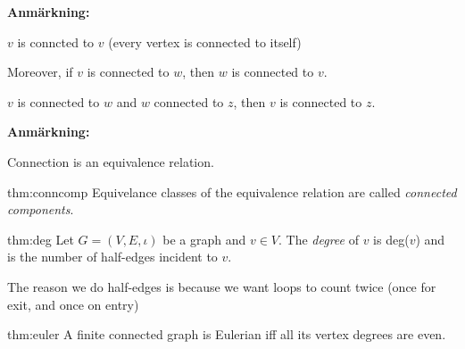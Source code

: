 \par\bigskip
\noindent\textbf{Anmärkning:}\par
\noindent $v$ is conncted to $v$ (every vertex is connected to itself)\par
\noindent Moreover, if $v$ is connected to $w$, then $w$ is connected to $v$.\par
\noindent $v$ is connected to $w$ and $w$ connected to $z$, then $v$ is connected to $z$.
\par\bigskip
\noindent\textbf{Anmärkning:}\par
\noindent Connection is an equivalence relation.
\par\bigskip
\begin{theo}{thm:conncomp}
  Equivelance classes of the equivalence relation are called \textit{connected components}.
\end{theo}
\par\bigskip
\begin{theo}{thm:deg}
  Let $G=(V,E,\iota)$ be a graph and $v\in V$. The \textit{degree} of $v$ is deg($v$) and is the number of half-edges incident to $v$.
\end{theo}\par
\noindent The reason we do half-edges is because we want loops to count twice (once for exit, and once on entry)
\par\bigskip
\begin{theo}[Euler; 1736]{thm:euler}
  A finite connected graph is Eulerian iff all its vertex degrees are even. 
\end{theo}
\newpage
